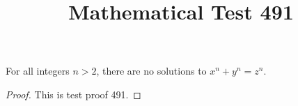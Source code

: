 \documentclass{amsart}
\begin{document}
\title{Mathematical Test 491}
\begin{theorem}
For all integers $n > 2$, there are no solutions to $x^n + y^n = z^n$.
\end{theorem}
\begin{proof}
This is test proof 491.
\end{proof}
\end{document}
